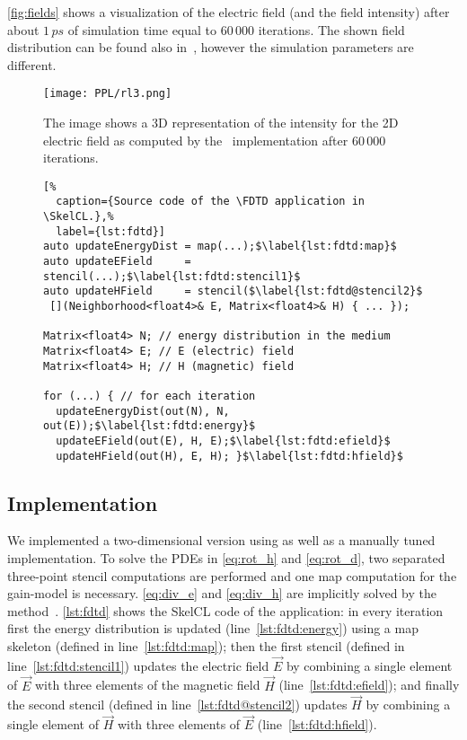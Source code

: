 \autoref{fig:fields} shows a visualization of the electric field (and the field intensity) after about  $1\,ps$ of simulation time equal to $60\,000$ iterations.
The shown field distribution can be found also in~\cite{Sebbah2002, Yamilov2005}, however the simulation parameters are different.

\begin{figure}[t]
    \centering
    \texttt{[image: PPL/rl3.png]}
    \caption[A 3D representation of the inensity of the 2D electric field as computed by the \SkelCL\ \FDTD implementation.]%
            {\small The image shows a 3D representation of the intensity for the 2D electric field as computed by the \SkelCL\ \FDTD implementation after $60\,000$ iterations.}
    \label{fig:fields}
\end{figure}

\begin{figure}[tbp]
\begin{lstlisting}[%
  caption={Source code of the \FDTD application in \SkelCL.},%
  label={lst:fdtd}]
auto updateEnergyDist = map(...);$\label{lst:fdtd:map}$
auto updateEField     = stencil(...);$\label{lst:fdtd:stencil1}$
auto updateHField     = stencil($\label{lst:fdtd@stencil2}$
 [](Neighborhood<float4>& E, Matrix<float4>& H) { ... });

Matrix<float4> N; // energy distribution in the medium
Matrix<float4> E; // E (electric) field
Matrix<float4> H; // H (magnetic) field

for (...) { // for each iteration
  updateEnergyDist(out(N), N, out(E));$\label{lst:fdtd:energy}$
  updateEField(out(E), H, E);$\label{lst:fdtd:efield}$
  updateHField(out(H), E, H); }$\label{lst:fdtd:hfield}$
\end{lstlisting}
\end{figure}

\subsection*{\SkelCL Implementation}

We implemented a two-dimensional version using \SkelCL as well as a manually tuned \OpenCL implementation.
To solve the PDEs in \autoref{eq:rot_h} and \autoref{eq:rot_d}, two separated three-point stencil computations are performed and one map computation for the gain-model is necessary.
\autoref{eq:div_e} and \autoref{eq:div_h} are implicitly solved by the \FDTD method~\cite{Yee1966}.
\autoref{lst:fdtd} shows the SkelCL code of the application:
in every iteration first the energy distribution is updated (line~\ref{lst:fdtd:energy}) using a map skeleton (defined in line~\ref{lst:fdtd:map});
then the first stencil (defined in line~\ref{lst:fdtd:stencil1}) updates the electric field $\vec{E}$ by combining a single element of $\vec{E}$ with three elements of the magnetic field $\vec{H}$ (line~\ref{lst:fdtd:efield});
and finally the second stencil (defined in line~\ref{lst:fdtd@stencil2}) updates $\vec{H}$ by combining a single element of $\vec{H}$ with three elements of $\vec{E}$ (line~\ref{lst:fdtd:hfield}).

